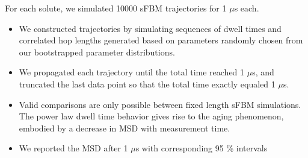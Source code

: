 \documentclass{article}
\begin{document}
  \noindent For each solute, we simulated 10000 sFBM trajectories for 1 $\mu$s each. 
  \begin{itemize}
	\item We constructed trajectories by simulating	sequences of dwell times and correlated 
	hop	lengths generated based on parameters randomly chosen from our bootstrapped parameter
	distributions.
	\item We propagated each trajectory until the total time reached 1 $\mu$s, and truncated
	the last data point so that the total time exactly equaled 1 $\mu$s. 
    \item Valid comparisons are only possible between fixed length sFBM simulations. The
    power law dwell time behavior gives rise to the aging phenomenon, embodied by
    a decrease in MSD with measurement time.~\cite{neusius_subdiffusion_2008,metzler_anomalous_2014}
    \item We reported the MSD after 1 $\mu$s with corresponding 95 \% intervals
  \end{itemize}
\end{document}
